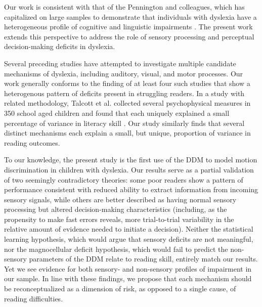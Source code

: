\documentclass[../uwthesis.tex]{subfiles}
\begin{document}
Our work is consistent with that of the Pennington and colleagues, which has capitalized on large samples to demonstrate that individuals with dyslexia have a heterogeneous profile of cognitive and linguistic impairments \citep{Pennington2006,Pennington2012IndividualModels.,Peterson2015}. The present work extends this perspective to address the role of sensory processing and perceptual decision-making deficits in dyslexia. 

Several preceding studies have attempted to investigate multiple candidate mechanisms of dyslexia, including auditory, visual, and motor processes. Our work generally conforms to the finding of at least four such studies \citep{Ho2002TheDyslexia.,Menghini2010DevelopmentalMemory.,Ramus2003,White2006}
that show a heterogenous pattern of deficits present in struggling readers. In a study with related methodology, Talcott et al. collected several psychophysical measures in 350 school aged children and found that each uniquely explained a small percentage of variance in literacy skill \citep{Talcott2002}. Our study similarly finds that several distinct mechanisms each explain a small, but unique, proportion of variance in reading outcomes. 

To our knowledge, the present study is the first use of the DDM to model motion discrimination in children with dyslexia. Our results serve as a partial validation of two seemingly contradictory theories: some poor readers show a pattern of performance consistent with reduced ability to extract information from incoming sensory signals, while others are better described as having normal sensory processing but altered decision-making characteristics (including, as the propensity to make fast errors reveals, more trial-to-trial variability in the relative amount of evidence needed to initiate a decision). Neither the statistical learning hypothesis, which would argue that sensory deficits are not meaningful, nor the magnocellular deficit hypothesis, which would fail to predict the non-sensory parameters of the DDM relate to reading skill, entirely match our results. Yet we see evidence for both sensory- and non-sensory profiles of impairment in our sample. In line with these findings, we propose that each mechanism should be reconceptualized as a dimension of risk, as opposed to a single cause, of reading difficulties.
\end{document}
